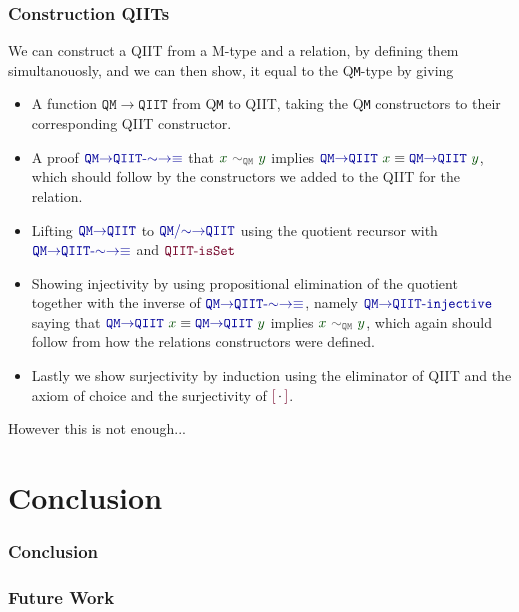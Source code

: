 \documentclass[xelatex,mathserif,serif,notheorems]{beamer} %
\theoremstyle{plain} %
\theoremstyle{definition}
\theoremstyle{remark}
\newcommand*{\term}[1]{\textcolor{green!30!black}{#1}} %
\newcommand*{\relation}[1]{\textcolor{gray!75!black}{\ensuremath{\mathtt{#1}}}}
\newcommand*{\function}[1]{\textcolor{blue!60!black}{\ensuremath{\mathtt{#1}}}}
\newcommand*{\constructor}[1]{\textcolor{purple!60!black}{\ensuremath{\mathtt{#1}}}}
\newcommand*{\quotientconstructor}[1]{\constructor{[}\,#1\,\constructor{]}}
\begin{document}
\begin{frame}
  \frametitle{Construction QIITs}
  We can construct a QIIT from a M-type and a relation, by defining them simultanouosly, and we can then show, it equal to the Q\texttt{M}-type by giving
  \begin{itemize}
  \item A function \function{QM{\rightarrow}QIIT} from Q\texttt{M} to QIIT, taking the Q\texttt{M} constructors to their corresponding QIIT constructor.
  \item A proof \(\function{QM{\rightarrow}QIIT\text{-}{\sim}{\rightarrow}{\equiv}}\) that \(\term{x}~\relation{\sim_{QM}}~\term{y}\) implies \(\function{QM{\rightarrow}QIIT}~\term{x} \equiv \function{QM{\rightarrow}QIIT}~\term{y}\), which should follow by the constructors we added to the QIIT for the relation.
  \item Lifting \(\function{QM{\rightarrow}QIIT}\) to \(\function{QM/{\sim}{\rightarrow}QIIT}\) using the quotient recursor with \(\function{QM{\rightarrow}QIIT\text{-}{\sim}{\rightarrow}{\equiv}}\) and \(\constructor{QIIT\text{-}isSet}\)
  \item Showing injectivity by using propositional elimination of the quotient together with the inverse of \(\function{QM{\rightarrow}QIIT\text{-}{\sim}{\rightarrow}{\equiv}}\), namely \(\function{QM{\rightarrow}QIIT\text{-}injective}\) saying that \(\function{QM{\rightarrow}QIIT}~\term{x} \equiv \function{QM{\rightarrow}QIIT}~\term{y}\) implies \(\term{x}~\relation{\sim_{QM}}~\term{y}\), which again should follow from how the relations constructors were defined.
  \item Lastly we show surjectivity by induction using the eliminator of QIIT and the axiom of choice and the surjectivity of \(\quotientconstructor{{\cdot}}\).
  \end{itemize}  
\end{frame}

\begin{frame}
  However this is not enough...
\end{frame}

\section{Conclusion}
\begin{frame}
  \frametitle{Conclusion}
\end{frame}

\begin{frame}
  \frametitle{Future Work}
\end{frame}
\end{document}
